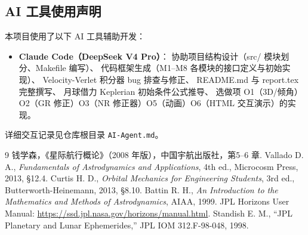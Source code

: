 \documentclass[12pt,a4paper]{ctexart}
\begin{document}
\subsection{AI 工具使用声明}
本项目使用了以下 AI 工具辅助开发：
\begin{itemize}
\item \textbf{Claude Code（DeepSeek V4 Pro）}：
  协助项目结构设计（src/ 模块划分、Makefile 编写）、
  代码框架生成（M1--M8 各模块的接口定义与初始实现）、
  Velocity-Verlet 积分器 bug 排查与修正、
  README.md 与 report.tex 完整撰写、
  月球借力 Keplerian 初始条件公式推导、
  选做项 O1（3D/倾角）O2（GR 修正）O3（NR 修正器）O5（动画）O6（HTML 交互演示）的实现。
\end{itemize}
详细交互记录见仓库根目录 \texttt{AI-Agent.md}。

\begin{thebibliography}{9}
 钱学森，《星际航行概论》（2008 年版），中国宇航出版社，第5--6 章.
 Vallado D. A., \textit{Fundamentals of Astrodynamics and Applications}, 4th ed., Microcosm Press, 2013, §12.4.
 Curtis H. D., \textit{Orbital Mechanics for Engineering Students}, 3rd ed., Butterworth-Heinemann, 2013, §8.10.
 Battin R. H., \textit{An Introduction to the Mathematics and Methods of Astrodynamics}, AIAA, 1999.
 JPL Horizons User Manual: \url{https://ssd.jpl.nasa.gov/horizons/manual.html}.
 Standish E. M., ``JPL Planetary and Lunar Ephemerides,'' JPL IOM 312.F-98-048, 1998.
\end{thebibliography}
\end{document}
